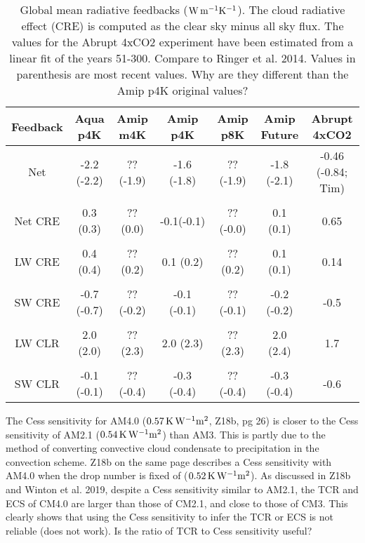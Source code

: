 \documentclass[11pt]{article}   	%
\begin{document}
\begin{table}
\begin{center}
\caption{Global mean radiative feedbacks ($\rm{W\, m^{-1} K^{-1}}$).  The cloud radiative effect (CRE) is computed as
 the clear sky minus all sky flux. The values for the Abrupt 4xCO2 experiment
have been estimated from a linear fit of the years 51-300.  Compare to Ringer et al. 2014.
Values in parenthesis are most recent values.  Why are they different than the Amip p4K 
original values?}
    \begin{tabular}{*{7}{c}}
    \hline
    \hline
 Feedback & Aqua p4K & Amip m4K & Amip p4K &  Amip p8K & Amip Future & Abrupt 4xCO2    \\ \hline
    Net          &   -2.2 (-2.2) & ?? (-1.9)  &  -1.6 (-1.8)      & ?? (-1.9)      & -1.8 (-2.1)    &    -0.46 (-0.84; Tim)         \\ 
    \\
    Net CRE      & 0.3 (0.3)  & ?? (0.0)  & -0.1(-0.1)    & ?? (-0.0)         & 0.1 (0.1)          & 0.65   \\  
    \\
    LW CRE       & 0.4 (0.4)  & ?? (0.2)  & 0.1 (0.2)  & ?? (0.2)        & 0.1 (0.1)          & 0.14    \\  
    \\
    SW CRE      & -0.7 (-0.7) & ?? (-0.2) & -0.1 (-0.1)  & ?? (-0.1)      & -0.2 (-0.2)         & -0.5              \\  
    \\
    LW CLR       & 2.0 (2.0)  & ?? (2.3) & 2.0 (2.3)   & ??  (2.3)       & 2.0 (2.4)         & 1.7             \\  
    \\
    SW CLR      & -0.1 (-0.1)  & ?? (-0.4) & -0.3 (-0.4)    & ?? (-0.4)        & -0.3 (-0.4)          & -0.6                   \\  \hline

    \end{tabular}\par
    \label{tab:lambda}
\end{center}
\end{table}

The Cess sensitivity for AM4.0 ($0.57 \, \rm{K\, W^{-1} m^2}$, Z18b, pg 26) is closer to the Cess sensitivity 
of AM2.1 ($0.54 \, \rm{K\, W^{-1} m^2}$) than AM3.  This is partly due to the method of converting convective cloud condensate to precipitation 
in the convection scheme.   Z18b on the same page describes a Cess sensitivity with AM4.0 when the drop number
is fixed of ($0.52 \, \rm{K\, W^{-1} m^2}$).  As discussed in Z18b and Winton et al. 2019, despite a Cess sensitivity similar to AM2.1, 
the TCR and ECS of CM4.0 are larger than those of CM2.1, and close to those of CM3.   This clearly 
shows that using the Cess sensitivity to infer the TCR or ECS is not reliable (does not work).   Is the ratio of TCR to
Cess sensitivity useful?  
\end{document}
